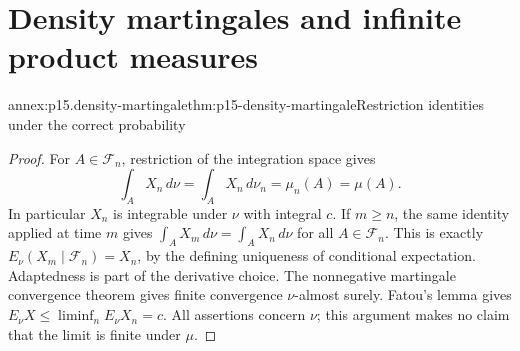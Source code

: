\section{Density martingales and infinite product measures}
\label{sec:annex-p15-density-martingales}

\begin{annexitem}{annex:p15.density-martingale}{thm:p15-density-martingale}{Restriction identities under the correct probability}
\begin{proof}
For \(A\in\mathcal F_n\), restriction of the integration space gives
\[
                 \int_A X_n\,d\nu
                  =\int_A X_n\,d\nu_n=\mu_n(A)=\mu(A).
\]
In particular \(X_n\) is integrable under \(\nu\) with integral \(c\).
If \(m\geq n\), the same identity applied at time \(m\) gives
\(\int_A X_m\,d\nu=\int_A X_n\,d\nu\) for all
\(A\in\mathcal F_n\). This is exactly
\(E_\nu(X_m\mid\mathcal F_n)=X_n\), by the defining uniqueness of
conditional expectation. Adaptedness is part of the derivative choice.
The nonnegative martingale convergence theorem gives finite convergence
\(\nu\)-almost surely. Fatou's lemma gives
\(E_\nu X\leq\liminf_nE_\nu X_n=c\).
All assertions concern \(\nu\); this argument makes no claim that the
limit is finite under \(\mu\).
\end{proof}
\end{annexitem}

